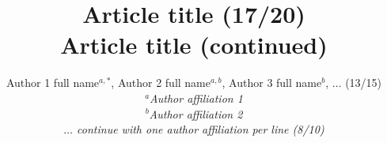 \documentclass[twocolumn,10pt]{article} %
\begin{document}
\title{\LARGE Article title (17/20)\\
                    Article title (continued)}

\author{{\large Author 1 full name$^{a,*}$, Author 2 full name$^{a,b}$, Author 3 full name$^{b}$, $\ldots$ (13/15)}\\[10pt]
        {\footnotesize \em $^a$Author affiliation 1}\\[-5pt]
        {\footnotesize \em $^b$Author affiliation 2}\\[-5pt]
        {\footnotesize \em $\ldots$ continue with one author affiliation per line (8/10)}}

\date{}


\small
\baselineskip 10pt

\end{document}
